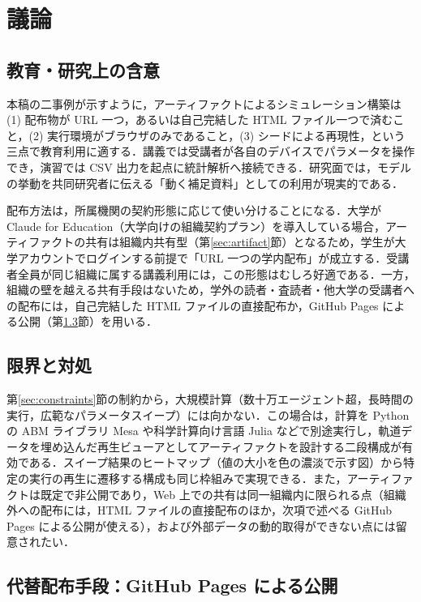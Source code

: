 \documentclass[a4paper]{jlreq}
\begin{document}
\section{議論}\label{sec:discussion}

\subsection{教育・研究上の含意}

本稿の二事例が示すように，アーティファクトによるシミュレーション構築は (1) 配布物が URL 一つ，あるいは自己完結した HTML ファイル一つで済むこと，(2) 実行環境がブラウザのみであること，(3) シードによる再現性，という三点で教育利用に適する．講義では受講者が各自のデバイスでパラメータを操作でき，演習では CSV 出力を起点に統計解析へ接続できる．研究面では，モデルの挙動を共同研究者に伝える「動く補足資料」としての利用が現実的である．

配布方法は，所属機関の契約形態に応じて使い分けることになる．大学が Claude for Education（大学向けの組織契約プラン）\cite{anthropic-education}を導入している場合，アーティファクトの共有は組織内共有型（第\ref{sec:artifact}節）となるため，学生が大学アカウントでログインする前提で「URL 一つの学内配布」が成立する．受講者全員が同じ組織に属する講義利用には，この形態はむしろ好適である．一方，組織の壁を越える共有手段はないため，学外の読者・査読者・他大学の受講者への配布には，自己完結した HTML ファイルの直接配布か，GitHub Pages による公開（第\ref{sec:ghpages}節）を用いる．

\subsection{限界と対処}

第\ref{sec:constraints}節の制約から，大規模計算（数十万エージェント超，長時間の実行，広範なパラメータスイープ）には向かない．この場合は，計算を Python の ABM ライブラリ Mesa や科学計算向け言語 Julia などで別途実行し，軌道データを埋め込んだ再生ビューアとしてアーティファクトを設計する二段構成が有効である．スイープ結果のヒートマップ（値の大小を色の濃淡で示す図）から特定の実行の再生に遷移する構成も同じ枠組みで実現できる．また，アーティファクトは既定で非公開であり，Web 上での共有は同一組織内に限られる点（組織外への配布には，HTML ファイルの直接配布のほか，次項で述べる GitHub Pages による公開が使える），および外部データの動的取得ができない点には留意されたい．

\subsection{代替配布手段：GitHub Pages による公開}\label{sec:ghpages}
\end{document}
